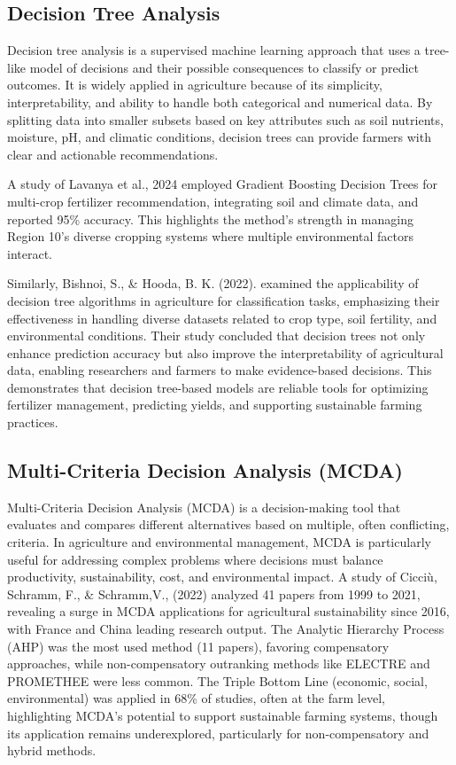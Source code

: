 {\subsection{Decision Tree Analysis}
Decision tree analysis is a supervised machine learning approach that uses a tree-like model of decisions and their possible consequences to classify or predict outcomes. It is widely applied in agriculture because of its simplicity, interpretability, and ability to handle both categorical and numerical data. By splitting data into smaller subsets based on key attributes such as soil nutrients, moisture, pH, and climatic conditions, decision trees can provide farmers with clear and actionable recommendations.

A study of Lavanya et al., 2024 employed Gradient Boosting Decision Trees for multi-crop fertilizer recommendation, integrating soil and climate data, and reported 95\% accuracy. This highlights the method’s strength in managing Region 10’s diverse cropping systems where multiple environmental factors interact.

Similarly, Bishnoi, S., \& Hooda, B. K. (2022).  examined the applicability of decision tree algorithms in agriculture for classification tasks, emphasizing their effectiveness in handling diverse datasets related to crop type, soil fertility, and environmental conditions. Their study concluded that decision trees not only enhance prediction accuracy but also improve the interpretability of agricultural data, enabling researchers and farmers to make evidence-based decisions. This demonstrates that decision tree-based models are reliable tools for optimizing fertilizer management, predicting yields, and supporting sustainable farming practices.

\subsection{Multi-Criteria Decision Analysis (MCDA)}

Multi-Criteria Decision Analysis (MCDA) is a decision-making tool that evaluates and compares different alternatives based on multiple, often conflicting, criteria. In agriculture and environmental management, MCDA is particularly useful for addressing complex problems where decisions must balance productivity, sustainability, cost, and environmental impact. A study of Cicciù, Schramm, F., \& Schramm,V., (2022) analyzed 41 papers from 1999 to 2021, revealing a surge in MCDA applications for agricultural sustainability since 2016, with France and China leading research output. The Analytic Hierarchy Process (AHP) was the most used method (11 papers), favoring compensatory approaches, while non-compensatory outranking methods like ELECTRE and PROMETHEE were less common. The Triple Bottom Line (economic, social, environmental) was applied in 68\% of studies, often at the farm level, highlighting MCDA’s potential to support sustainable farming systems, though its application remains underexplored, particularly for non-compensatory and hybrid methods.

}
